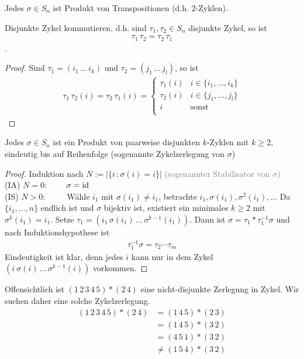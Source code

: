 \begin{satz}[LAAG IV.1.3]
	Jedes $\sigma \in S_n$ ist Produkt von Transpositionen (d.h. 2-Zyklen).
\end{satz}

\begin{lemma}
	Disjunkte Zykel kommutieren, d.h. sind $\tau_1, \tau_2 \in S_n$ disjunkte Zykel, so ist
	\begin{align*}
		\tau_1 \, \tau_2 = \tau_2 \, \tau_1
	\end{align*}.
\end{lemma}
\begin{proof}
	Sind $\tau_1 = ( i_1 \, \dots \, i_k)$ und $\tau_2 = (j_1 \, \dots \, j_l)$, so ist
	\begin{align*}
		\tau_1 \, \tau_2 (i) = \tau_2 \, \tau_1 (i) = \begin{cases}
		\tau_1 (i) & i \in \{i_1 , \dots , i_k \} \\
		\tau_2 (i) & i \in \{j_1 , \dots , j_l \} \\
		i & \text{sonst} \\
		\end{cases}
	\end{align*}
\end{proof}

\begin{satz} [Zykelzerlegung]
	Jedes $\sigma \in S_n$ ist ein Produkt von paarweise disjunkten $k$-Zyklen mit $k \geq 2$, eindeutig bis auf Reihenfolge (sogenannte Zykelzerlegung von $\sigma$)
\end{satz}
\begin{proof}
	Induktion nach $N:=\left| \{i \, : \sigma(i) = i \} \right|$ \textcolor{gray}{(sogenannter Stabilisator von $\sigma$)} \\
	(IA) $N=0$: $\qquad \sigma = \operatorname{id}$ \\
	(IS) $N > 0$: $\qquad$ Wähle $i_1$ mit $\sigma(i_1) \neq i_1$, betrachte $i_1, \sigma(i_1), \sigma^2(i_1), \dots$ Da $\{i_1 , \dots , n \}$ endlich ist und $\sigma$ bijektiv ist, existiert ein minimales $k \geq 2$ mit $\sigma^k(i_1)=i_1$. Setze $\tau_1 = (i_1 \, \sigma(i_1) \, \dots \, \sigma^{k-1}(i_1))$. Dann ist $\sigma = \tau_1 * \tau_1^{-1}\sigma$ und nach Induktionshypothese ist
	\begin{align*}
		\tau_1^{-1}\sigma = \tau_2 \cdots \tau_m
	\end{align*}
	Eindeutigkeit ist klar, denn jedes $i$ kann nur in dem Zykel $( i \: \sigma(i) \, \dots \, \sigma^{k-1}(i))$ vorkommen.
\end{proof}

\begin{bsp}
	Offensichtlich ist $(1 \, 2 \, 3 \, 4 \, 5) * ( 2\, 4)$ eine nicht-disjunkte Zerlegung in Zykel. Wir suchen daher eine solche Zykelzerlegung.
	\begin{align*}
		(1 \, 2 \, 3 \, 4 \, 5) * ( 2\, 4) &= (1 \, 4 \, 5) * (2 \, 3) \\
		&= (1 \, 4 \, 5) * (3 \, 2) \\
		&= (4 \, 5 \, 1) * (3 \, 2) \\
		&\neq (1 \, 5 \, 4) * (3 \, 2)
	\end{align*}
\end{bsp}